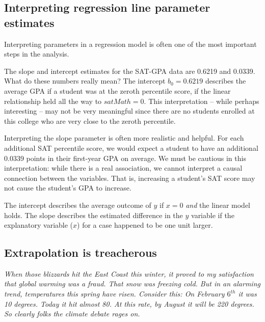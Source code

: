 \subsection{Interpreting regression line parameter estimates}

Interpreting parameters in a regression model is often one of the most important steps in the analysis.

\begin{example}{The slope and intercept estimates for the SAT-GPA data are 0.6219 and 0.0339. What do these numbers really mean?}
The intercept $b_0=0.6219$ describes the average GPA if a student was at the zeroth percentile score, if the linear relationship held all the way to $satMath=0$. This interpretation -- while perhaps interesting -- may not be very meaningful since there are no students enrolled at this college who are very close to the zeroth percentile.

Interpreting the slope parameter is often more realistic and helpful. For each additional SAT percentile score, we would expect a student to have an additional 0.0339 points in their first-year GPA on average. We must be cautious in this interpretation: while there is a real association, we cannot interpret a causal connection between the variables. That is, increasing a student's SAT score may not cause the student's GPA to increase.
\end{example}

\begin{termBox}{
The intercept describes the average outcome of $y$ if $x=0$ \emph{and} the linear model holds. The slope describes the estimated difference in the $y$ variable if the explanatory variable ($x$) for a case happened to be one unit larger.}
\end{termBox}

\subsection{Extrapolation is treacherous}

{\em\small When those blizzards hit the East Coast this winter, it proved to my satisfaction that global warming was a fraud. That snow was freezing cold. But in an alarming trend, temperatures this spring have risen. Consider this: On February $6^{th}$ it was 10 degrees. Today it hit almost 80. At this rate, by August it will be 220 degrees. So clearly folks the climate debate rages on.\vspace{0.5mm}}

